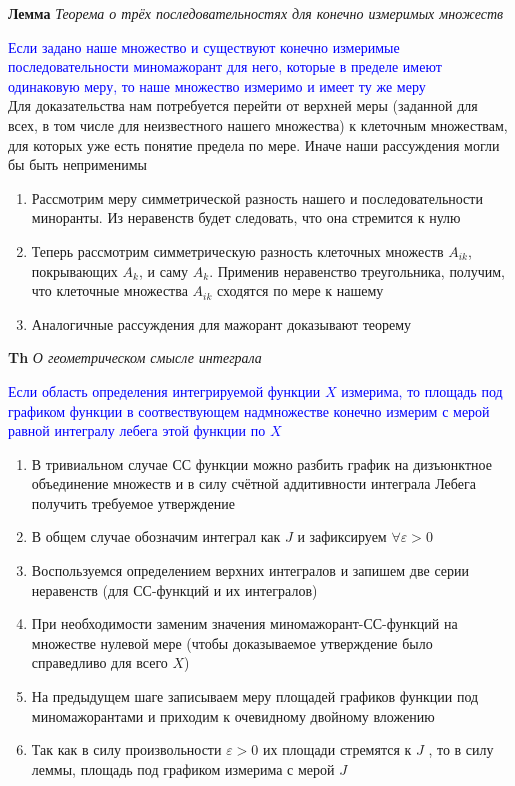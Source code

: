 \textbf{Лемма} \textit{Теорема о трёх последовательностях для конечно измеримых множеств}

\textcolor{blue}{Если задано наше множество и существуют конечно измеримые последовательности
миномажорант для него, которые в пределе имеют одинаковую меру, то наше множество измеримо и имеет ту же меру} \\

Для доказательства нам потребуется перейти от верхней меры (заданной для всех, в том числе для неизвестного нашего
множества) к клеточным множествам, для которых уже есть понятие предела по мере.
Иначе наши рассуждения могли бы быть неприменимы

\begin{enumerate}
    \item Рассмотрим  меру симметрической разность нашего и последовательности миноранты.
    Из неравенств будет следовать, что она стремится к нулю
    \item Теперь рассмотрим симметрическую разность клеточных множеств $A_{ik}$, покрывающих $A_k$, и саму $A_k$.
    Применив неравенство треугольника, получим, что клеточные множества $A_{ik}$ сходятся по мере к нашему
    \item Аналогичные рассуждения для мажорант доказывают теорему
\end{enumerate}

\textbf{Th} \textit{О геометрическом смысле интеграла}

\textcolor{blue}{Если область определения интегрируемой функции $X$ измерима, то площадь под графиком функции в
соотвествующем надмножестве конечно измерим с мерой равной интегралу лебега этой функции по $X$}

\begin{enumerate}
    \item В тривиальном случае СС функции можно разбить график на дизъюнктное объединение множеств и в силу
    счётной аддитивности интеграла Лебега получить требуемое утверждение
    \item В общем случае обозначим интеграл как $J$ и зафиксируем $\forall \varepsilon > 0$
    \item Воспользуемся определением верхних интегралов и запишем две серии неравенств (для СС-функций и их
    интегралов)
    \item При необходимости заменим значения миномажорант-СС-функций на множестве нулевой мере (чтобы
    доказываемое утверждение было справедливо для всего $X$)
    \item На предыдущем шаге записываем меру площадей графиков функции под миномажорантами и приходим к
    очевидному двойному вложению
    \item Так как в силу произвольности $\varepsilon > 0$ их площади стремятся к $J$ , то в силу леммы, площадь под
    графиком измерима с мерой $J$
\end{enumerate}

